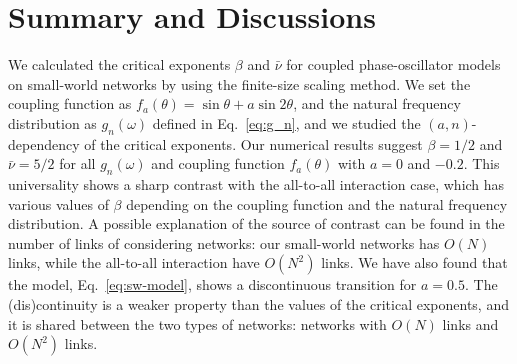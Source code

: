 \section{Summary and Discussions}
\label{sec:conclusion}
We calculated the critical exponents $\beta$ and $\bar{\nu}$
for coupled phase-oscillator models on small-world networks
by using the finite-size scaling method.
We set the coupling function as $f_{a}(\theta)=\sin\theta+a\sin2\theta$, and the natural frequency distribution
as $g_{n}(\omega)$ defined in Eq.~\eqref{eq:g_n},
and we studied the $(a,n)$-dependency of the critical exponents.
Our numerical results suggest $\beta=1/2$ and $\bar{\nu}=5/2$
for all $g_{n}(\omega)$ and coupling function $f_{a}(\theta)$ with $a=0$ and $-0.2$.
This universality shows a sharp contrast with the all-to-all interaction case,
which has various values of $\beta$ depending on the coupling function and the natural frequency distribution.
A possible explanation of the source of contrast
can be found in the number of links of considering networks:
our small-world networks has $O(N)$ links,
while the all-to-all interaction have $O(N^{2})$ links.
We have also found that the model, Eq.~\eqref{eq:sw-model},
shows a discontinuous transition for $a=0.5$.
The (dis)continuity is a weaker property than the values of the critical exponents,
and it is shared between the two types of networks:
networks with $O(N)$ links and $O(N^{2})$ links.

